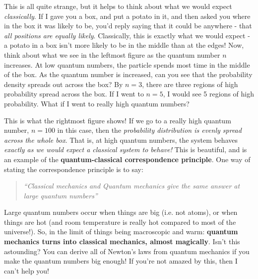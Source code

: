 \documentclass{memoir}[11pt,oneside,a4paper,openany]
\begin{document}
This is all quite strange, but it helps to think about what we would expect \emph{classically}. If I gave you a box, and put a potato in it, and then asked you where in the box it was likely to be, you'd reply saying that it could be anywhere - that \emph{all positions are equally likely}. Classically, this is exactly what we would expect - a potato in a box isn't more likely to be in the middle than at the edges! Now, think about what we see in the leftmost figure as the quantum number $n$ increases. At low quantum numbers, the particle spends most time in the middle of the box. As the quantum number is increased, can you see that the probability density spreads out across the box? By $n=3$, there are three regions of high probability spread across the box. If I went to $n=5$, I would see 5 regions of high probability. What if I went to really high quantum numbers?

This is what the rightmost figure shows! If we go to a really high quantum number, $n=100$ in this case, then the \emph{probability distribution is evenly spread across the whole box}. That is, at high quantum numbers, the system behaves \emph{exactly as we would expect a classical system to behave!} This is beautiful, and is an example of the \textbf{quantum-classical correspondence principle}. One way of stating the correspondence principle is to say:
\begin{quote}
	\textit{``Classical mechanics and Quantum mechanics give the same answer at large quantum numbers''}
\end{quote}
Large quantum numbers occur when things are big (i.e. not atoms), or when things are hot (and room temperature is really hot compared to most of the universe!). So, in the limit of things being macroscopic and warm: \textbf{quantum mechanics turns into classical mechanics, almost magically}. Isn't this astounding? You can derive all of Newton's laws from quantum mechanics if you make the quantum numbers big enough! If you're not amazed by this, then I can't help you!
\vfill
\end{document}

